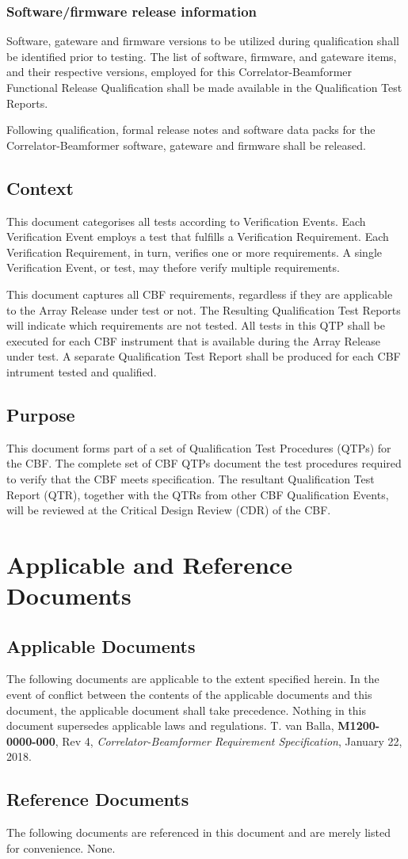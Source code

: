 \subsection{Software/firmware release information}
Software, gateware and firmware versions to be utilized during qualification shall be identified prior to testing. The list of software, firmware, and gateware items, and their respective versions, employed for this Correlator-Beamformer Functional Release Qualification shall be made available in the Qualification Test Reports.

Following qualification, formal release notes and software data packs for the Correlator-Beamformer software, gateware and firmware shall be released.
\section{Context}
This document categorises all tests according to Verification Events. Each Verification Event employs a test that fulfills a Verification Requirement. Each Verification Requirement, in turn, verifies one or more requirements. A single Verification Event, or test, may thefore verify multiple requirements.

This document captures all CBF requirements, regardless if they are applicable to the Array Release under test or not. The Resulting Qualification Test Reports will indicate which requirements are not tested. All tests in this QTP shall be executed for each CBF instrument that is available during the Array Release under test. A separate Qualification Test Report shall be produced for each CBF intrument tested and qualified.
\section{Purpose}
This document forms part of a set of Qualification Test Procedures (QTPs) for the CBF. The complete set of CBF QTPs document the test procedures required to verify that the CBF meets specification.
The resultant Qualification Test Report (QTR), together with the QTRs from other CBF Qualification Events, will be reviewed at the Critical Design Review (CDR) of the CBF.
\chapter{Applicable and Reference Documents}
\section{Applicable Documents}
The following documents are applicable to the extent specified herein. In the event of conflict between the contents of the applicable documents and this document, the applicable document shall take precedence.  Nothing in this document supersedes applicable laws and regulations.
\newline\newline
[1]\hspace{10mm} T. van Balla, {\bf M1200-0000-000}, Rev 4, {\it Correlator-Beamformer Requirement Specification}, January 22, 2018.
\section{Reference Documents}
The following documents are referenced in this document and are merely listed for convenience.\newline\newline
\hspace{10mm}None.

